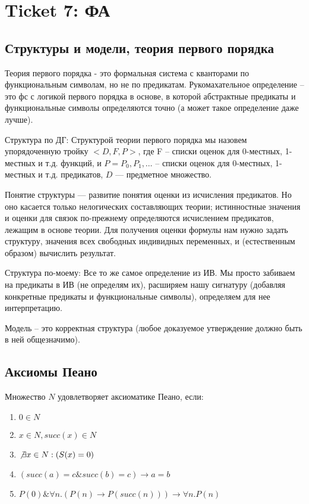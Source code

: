 \section{Ticket 7: ФА}
\label{sec-9}
\subsection{Структуры и модели, теория первого порядка}
\label{sec-9-1}
Теория первого порядка - это формальная система с кванторами по
функциональным символам, но не по предикатам. Рукомахательное
определение – это фс с логикой первого порядка в основе, в которой
абстрактные предикаты и функциональные символы определяются точно
(а может такое определение даже лучше).

Структура по ДГ:
Структурой теории первого порядка мы назовем упорядоченную тройку
$<D, F, P>$, где F -- списки оценок для 0-местных, 1-местных и т.д.
функций, и $P = P_0, P_1,\ldots$ -- списки оценок для 0-местных,
1-местных и т.д. предикатов, $D$ — предметное множество.

Понятие структуры — развитие понятия оценки из исчисления предикатов.
Но оно касается только нелогических составляющих теории; истинностные
значения и оценки для связок по-прежнему определяются исчислением
предикатов, лежащим в основе теории. Для получения оценки формулы
нам нужно задать структуру, значения всех свободных индивидных
переменных, и (естественным образом) вычислить результат.

Структура по-моему:
Все то же самое определение из ИВ. Мы просто забиваем на предикаты
в ИВ (не определям их), расширяем нашу сигнатуру (добавляя конкретные
предикаты и функциональные символы), определяем для нее интерпретацию.

Модель -- это корректная структура (любое доказуемое утверждение должно
быть в ней общезначимо).
\subsection{Аксиомы Пеано}
\label{sec-9-2}
Множество $N$ удовлетворяет аксиоматике Пеано, если:
\begin{enumerate}
\item $0 \in N$
\item $x \in N, succ(x) \in N$
\item $\not \exists x \in N : (S(x) = 0)$
\item $(succ(a) = c \& succ(b) = c) \to a = b$
\item $P(0) \& \forall n.(P(n) \to P(succ(n))) \to \forall n.P(n)$
\end{enumerate}
